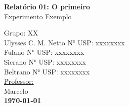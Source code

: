 \documentclass{article}
\begin{document}
\begin{titlepage}
\begin{center}
\begin{figure}[!ht]
			\end{figure}
					
			\vspace{200pt}
			
			\LARGE{\textbf{Relatório 01: O primeiro}}\\ %
			\Large{Experimento Exemplo}\\ %
			
			\vspace{150pt}
			
			\hfill Grupo: XX \\%
			
			\vspace{40pt} %
			\hfill Ulysses C. M. Netto\hspace{20pt} N° USP: xxxxxxxx\\
		    \hfill Fulano \hspace{20pt} N° USP: xxxxxxxx\\
		    \hfill Sicrano \hspace{20pt} N° USP: xxxxxxxx\\
			\hfill Beltrano \hspace{20pt} N° USP: xxxxxxxx\\
			
			\vspace{25pt}
			\hfill \underline{Professor:}\\
			\hfill Marcelo\\ %
			
			
			\vspace{\fill}
			\large\bf{\today}
			
		\end{center}
	\end{titlepage}
	
	
	\newpage
	
	\listoffigures %
	\newpage
	
	\pagestyle{fancy}
	\fancyhead[C]{}
	\fancyfoot[L]{}
	\fancyfoot[C]{\thepage}
	\fancyfoot[R]{}
	\renewcommand{\headrulewidth}{0.4pt}
	\renewcommand{\footrulewidth}{0.4pt}
	
\end{document}
